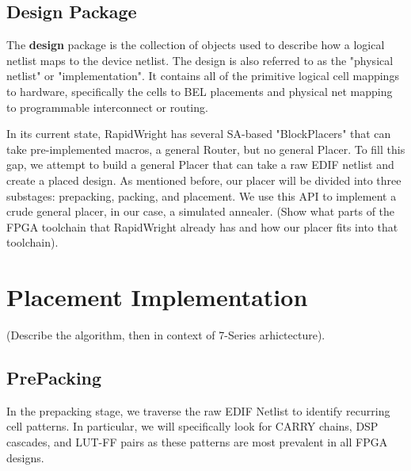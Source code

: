 \documentclass[twocolumn]{article}
\begin{document}
    \subsection{Design Package}
    The \textbf{design} package is the collection of objects used to describe how a logical netlist maps to the device netlist. 
    The design is also referred to as the "physical netlist" or "implementation". 
    It contains all of the primitive logical cell mappings to hardware, specifically the cells to BEL placements and physical net mapping to programmable interconnect or routing. 

    In its current state, RapidWright has several SA-based "BlockPlacers" that can take pre-implemented macros, a general Router, but no general Placer. 
    To fill this gap, we attempt to build a general Placer that can take a raw EDIF netlist and create a placed design. 
    As mentioned before, our placer will be divided into three substages: prepacking, packing, and placement.
    We use this API to implement a crude general placer, in our case, a simulated annealer. 
    (Show what parts of the FPGA toolchain that RapidWright already has and how our placer fits into that toolchain). 


\section{Placement Implementation}
    (Describe the algorithm, then in context of 7-Series arhictecture). \\
    \subsection{PrePacking}
        In the prepacking stage, we traverse the raw EDIF Netlist to identify recurring cell patterns. 
        In particular, we will specifically look for CARRY chains, DSP cascades, and LUT-FF pairs as these patterns are most prevalent in all FPGA designs.
\end{document}
